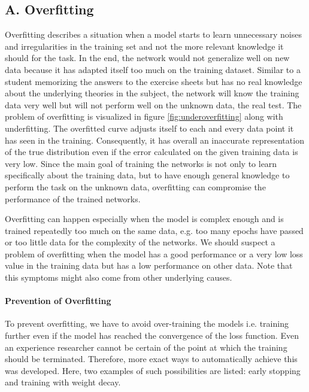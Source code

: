 \subsection*{A. Overfitting}
Overfitting describes a situation when a model starts to learn unnecessary noises and irregularities in the training set and not the more relevant knowledge it should for the task. In the end, the network would not generalize well on new data because it has adapted itself too much on the training dataset. Similar to a student memorizing the answers to the exercise sheets but has no real knowledge about the underlying theories in the subject, the network will know the training data very well but will not perform well on the unknown data, the real test. The problem of overfitting is visualized in figure \ref{fig:underoverfitting} along with underfitting. The overfitted curve adjusts itself to each and every data point it has seen in the training. Consequently, it has overall an inaccurate representation of the true distribution even if the error calculated on the given training data is very low. Since the main goal of training the networks is not only to learn specifically about the training data, but to have enough general knowledge to perform the task on the unknown data, overfitting can compromise the performance of the trained networks.

Overfitting can happen especially when the model is complex enough and is trained repeatedly too much on the same data, e.g. too many epochs have passed or too little data for the complexity of the networks. We should suspect a problem of overfitting when the model has a good performance or a very low loss value in the training data but has a low performance on other data. Note that this symptoms might also come from other underlying causes. 

\paragraph*{Prevention of Overfitting}
To prevent overfitting, we have to avoid over-training the models i.e. training further even if the model has reached the convergence of the loss function. Even an experience researcher cannot be certain of the point at which the training should be terminated. Therefore, more exact ways to automatically achieve this was developed. Here, two examples of such possibilities are listed: early stopping and training with weight decay.  

